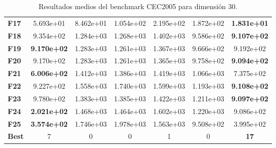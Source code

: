\begin{table}
{\begin{tabular}{lcccccc}
		\textbf{F17}  &  5.693e+01 &  8.462e+01 &  1.054e+02 &  2.195e+02 &  1.872e+02 &  \textbf{1.831e+01} \\
		\textbf{F18}  &  9.354e+02 &  1.284e+03 &  1.268e+03 &  1.402e+03 &  9.586e+02 &  \textbf{9.107e+02} \\
		\textbf{F19}  &  \textbf{9.170e+02} &  1.283e+03 &  1.261e+03 &  1.367e+03 &  9.666e+02 &  9.192e+02 \\
		\textbf{F20}  &  9.170e+02 &  1.283e+03 &  1.261e+03 &  1.365e+03 &  9.758e+02 &  \textbf{9.094e+02} \\
		\textbf{F21}  &  \textbf{6.006e+02} &  1.412e+03 &  1.386e+03 &  1.419e+03 &  1.066e+03 &  7.375e+02 \\
		\textbf{F22}  &  9.227e+02 &  1.558e+03 &  1.740e+03 &  1.599e+03 &  1.193e+03 &  \textbf{9.108e+02} \\
		\textbf{F23}  &  9.780e+02 &  1.383e+03 &  1.385e+03 &  1.422e+03 &  1.211e+03 &  \textbf{9.097e+02} \\
		\textbf{F24}  &  \textbf{2.021e+02} &  1.468e+03 &  1.464e+03 &  1.602e+03 &  1.220e+03 &  9.086e+02 \\
		\textbf{F25}  &  \textbf{3.574e+02} &  1.746e+03 &  1.978e+03 &  1.563e+03 &  9.508e+02 &  3.995e+02 \\
		\midrule
		\textbf{Best} &          7 &          0 &          0 &          1 &          0 &         \textbf{17} \\
		\bottomrule
	\end{tabular}}
	\caption{Resultados medios del benchmark CEC2005 para dimensión 30.}
\end{table}

